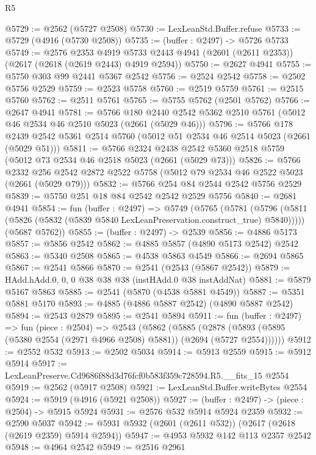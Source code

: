 \begin{lexlean}{R5}
\begin{coremodule}
@5729 := @2562 (@5727 @2508)
@5730 := LexLeanStd.Buffer.refuse
@5733 := @5729 (@4916 (@5730 @2508))
@5735 := (buffer : @2497) -> @5726 @5733
@5749 := @2576
    @2353
    @4919
    @5733
    @2443
    @4941
    (@2601 (@2611 @2353))
    (@2617 (@2618 (@2619 @2443) @4919 @2594))
@5750 := @2627 @4941
@5755 := @5750 @303 @99 @2441 @5367 @2542
@5756 := @2524 @2542
@5758 := @2502 @5756 @2529
@5759 := @2523 @5758
@5760 := @2519 @5759
@5761 := @2515 @5760
@5762 := @2511 @5761
@5765 := @5755 @5762 (@2501 @5762)
@5766 := @2647 @4941
@5781 := @5766
    @180
    @2440
    @2542
    @5362
    @2510
    @5761
    (@5012 @46 @2534 @46 @2510 @5023 (@2661 (@5029 @46)))
@5796 := @5766
    @178
    @2439
    @2542
    @5361
    @2514
    @5760
    (@5012 @51 @2534 @46 @2514 @5023 (@2661 (@5029 @51)))
@5811 := @5766
    @2324
    @2438
    @2542
    @5360
    @2518
    @5759
    (@5012 @73 @2534 @46 @2518 @5023 (@2661 (@5029 @73)))
@5826 := @5766
    @2332
    @256
    @2542
    @2872
    @2522
    @5758
    (@5012 @79 @2534 @46 @2522 @5023 (@2661 (@5029 @79)))
@5832 := @5766 @254 @84 @2544 @2542 @5756 @2529
@5839 := @5750 @251 @18 @84 @2542 @2542 @2529 @5756
@5840 := @2681 @4941
@5854 := fun (buffer : @2497) =>
  @5749
    (@5765
      (@5781 (@5796 (@5811 (@5826 (@5832 (@5839 @5840 LexLeanPreservation.construct_true) @5840)))))
      (@5687 @5762))
@5855 := (buffer : @2497) -> @2539
@5856 := @4886 @5173
@5857 := @5856 @2542
@5862 := @4885 @5857 (@4890 @5173 @2542) @2542
@5863 := @5340 @2508
@5865 := @4538 @5863 @4549
@5866 := @2694 @5865
@5867 := @2541 @5866
@5870 := @2541 (@2543 (@5867 @2542))
@5879 := HAdd.hAdd.{0, 0, 0} @38 @38 @38 (instHAdd.{0} @38 instAddNat)
@5881 := @5879 @5167 @5863
@5885 := @2541 (@5870 (@4538 @5881 @4549))
@5887 := @5351 @5881 @5170
@5893 := @4885 (@4886 @5887 @2542) (@4890 @5887 @2542)
@5894 := @2543 @2879
@5895 := @2541 @5894
@5911 := fun (buffer : @2497) =>
  fun (piece : @2504) =>
  @2543
    (@5862
      (@5885 (@2878 (@5893 (@5895 (@5380 @2554 (@2971 @4966 @2508) @5881)) (@2694 (@5727 @2554))))))
@5912 := @2552 @532
@5913 := @2502 @5034
@5914 := @5913 @2559
@5915 := @5912 @5914
@5917 := LexLeanPreserve.Cd9686f88d3d76fcf0b583f359c728594.R5.__fits_15 @2554
@5919 := @2562 (@5917 @2508)
@5921 := LexLeanStd.Buffer.writeBytes @2554
@5924 := @5919 (@4916 (@5921 @2508))
@5927 := (buffer : @2497) -> (piece : @2504) -> @5915 @5924
@5931 := @2576 @532 @5914 @5924 @2359
@5932 := @2590 @5037
@5942 := @5931 @5932 (@2601 (@2611 @532)) (@2617 (@2618 (@2619 @2359) @5914 @2594))
@5947 := @4953 @5932 @142 @113 @2357 @2542
@5948 := @4964 @2542
@5949 := @2516 @2961

\end{coremodule}
\end{lexlean}

